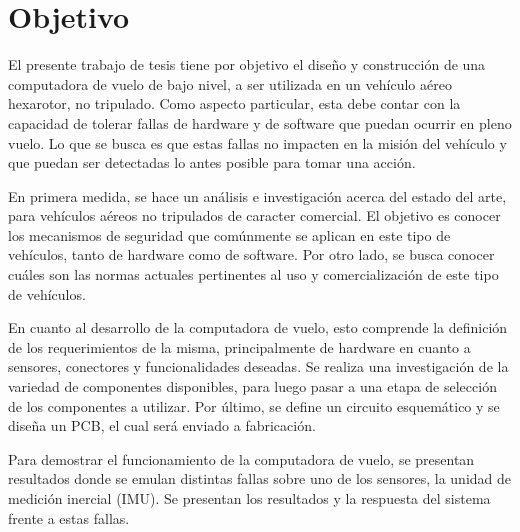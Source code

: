 \section{Objetivo}


El presente trabajo de tesis tiene por objetivo el diseño y construcción de una computadora de vuelo de bajo nivel, a ser utilizada en un vehículo aéreo hexarotor, no tripulado. Como aspecto particular, esta debe contar con la capacidad de tolerar fallas de hardware y de software que puedan ocurrir en pleno vuelo. Lo que se busca es que estas fallas no impacten en la misión del vehículo y que puedan ser detectadas lo antes posible para tomar una acción.

En primera medida, se hace un análisis e investigación acerca del estado del arte, para vehículos aéreos no tripulados de caracter comercial. El objetivo es conocer los mecanismos de seguridad que comúnmente se aplican en este tipo de vehículos, tanto de hardware como de software. Por otro lado, se busca conocer cuáles son las normas actuales pertinentes al uso y comercialización de este tipo de vehículos.

En cuanto al desarrollo de la computadora de vuelo, esto comprende la definición de los requerimientos de la misma, principalmente de hardware en cuanto a sensores, conectores y funcionalidades deseadas. Se realiza una investigación de la variedad de componentes disponibles, para luego pasar a una etapa de selección de los componentes a utilizar. Por último, se define un circuito esquemático y se diseña un PCB, el cual será enviado a fabricación.



Para demostrar el funcionamiento de la computadora de vuelo, se presentan resultados donde se emulan distintas fallas sobre uno de los sensores, la unidad de medición inercial (IMU). Se presentan los resultados y la respuesta del sistema frente a estas fallas.